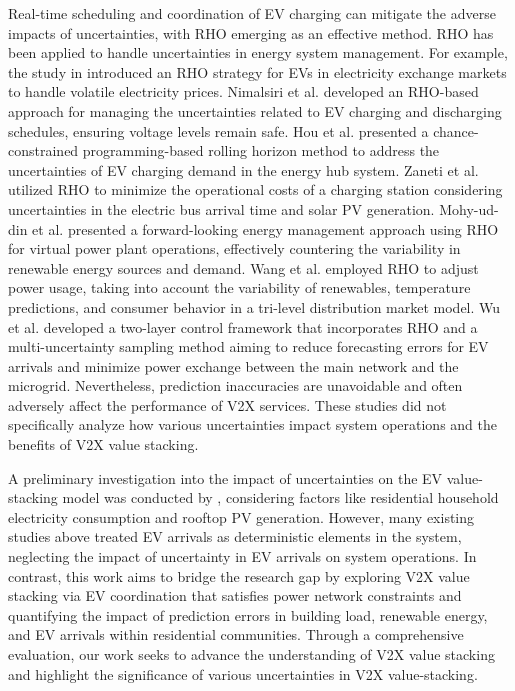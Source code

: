 Real-time scheduling and coordination of EV charging can mitigate the adverse impacts of uncertainties, with RHO emerging as an effective method. RHO has been applied to handle uncertainties in energy system management. For example, the study in \citep{Su2020} introduced an RHO strategy for EVs in electricity exchange markets to handle volatile electricity prices. Nimalsiri et al. \citep{nimalsiri2021coordinated} developed an RHO-based approach for managing the uncertainties related to EV charging and discharging schedules, ensuring voltage levels remain safe. Hou et al. \citep{hou2020real} presented a chance-constrained programming-based rolling horizon method to address the uncertainties of EV charging demand in the energy hub system. Zaneti et al. \citep{zaneti2022sustainable} utilized RHO to minimize the operational costs of a charging station considering uncertainties in the electric bus arrival time and solar PV generation. Mohy-ud-din et al. \citep{muttaqi2021adaptive} presented a forward-looking energy management approach using RHO for virtual power plant operations, effectively countering the variability in renewable energy sources and demand. Wang et al. \citep{wang2023tri} employed RHO to adjust power usage, taking into account the variability of renewables, temperature predictions, and consumer behavior in a tri-level distribution market model. Wu et al. \citep{wu2021model} developed a two-layer control framework that incorporates RHO and a multi-uncertainty sampling method aiming to reduce forecasting errors for EV arrivals and minimize power exchange between the main network and the microgrid. Nevertheless, prediction inaccuracies are unavoidable and often adversely affect the performance of V2X services. These studies did not specifically analyze how various uncertainties impact system operations and the benefits of V2X value stacking. 

A preliminary investigation into the impact of uncertainties on the EV value-stacking model was conducted by \citep{jiang2023network}, considering factors like residential household electricity consumption and rooftop PV generation. However, many existing studies above treated EV arrivals as deterministic elements in the system, neglecting the impact of uncertainty in EV arrivals on system operations. In contrast, this work aims to bridge the research gap by exploring V2X value stacking via EV coordination that satisfies power network constraints and quantifying the impact of prediction errors in building load, renewable energy, and EV arrivals within residential communities. Through a comprehensive evaluation, our work seeks to advance the understanding of V2X value stacking and highlight the significance of various uncertainties in V2X value-stacking.